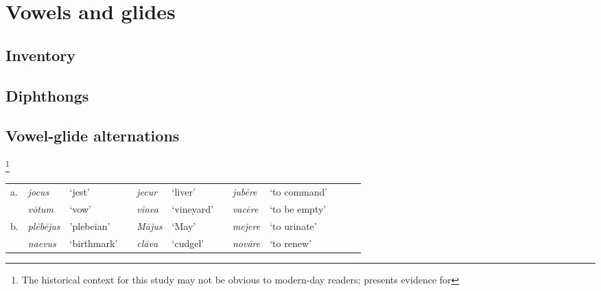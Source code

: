 \chapter{Vowels and glides}
\label{vowels}

\section{Inventory}

\section{Diphthongs}

\section{Vowel-glide alternations}

\citet{Hill1954}
\footnote{The historical context for this study may not be obvious to modern-day readers; \citeauthor{Hill1954} presents evidence for}

\citet{Steriade1984}

\begin{example}
\vspace{\baselineskip}
\begin{tabular}{l ll l ll l ll l ll}
a. & \emph{jocus}    & `jest'      && \emph{jecur}  & `liver'     && \emph{jubēre} & `to command' \\
   & \emph{vōtum}    & `vow'       && \emph{vīnea}  & `vineyard'  && \emph{vacēre} & `to be empty' \\
b. & \emph{plēbējus} & 'plebeian'  && \emph{Mājus}  & `May'       && \emph{mejere} & `to urinate' \\
   & \emph{naevus}   & `birthmark' && \emph{clāva}  & `cudgel'    && \emph{novāre} & `to renew' \\
\end{tabular}
\end{example}

